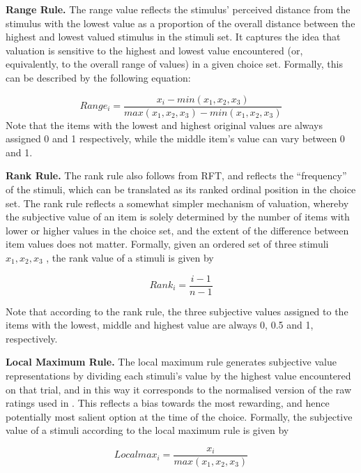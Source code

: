 \documentclass[11pt,a4paper]{article}
\begin{document}
 \textbf{Range Rule.} The range value reflects the stimulus' perceived distance from the stimulus with the lowest value as a proportion of the overall distance between the highest and lowest valued stimulus in the stimuli set. It captures the idea that valuation is sensitive to the highest and lowest value encountered (or, equivalently, to the overall range of values) in a given choice set. Formally, this can be described by the following equation:
 
\begin{equation}
Range_{i}=\frac{x_i - min(x_1,x_2,x_3)}{max(x_1,x_2,x_3)-min(x_1,x_2,x_3)}
\label{eq:range}
\end{equation}
 Note that the items with the lowest and highest original values are always assigned 0 and 1 respectively, while the middle item's value can vary between 0 and 1.
 
 
 \textbf{Rank Rule.} The rank rule also follows from RFT, and reflects the “frequency” of the stimuli, which can be translated as its ranked ordinal position in the choice set. The rank rule reflects a somewhat simpler mechanism of valuation, whereby the subjective value of an item is solely determined by the number of items with lower or higher values in the choice set, and the extent of the difference between item values does not matter. Formally, given an ordered set of three stimuli $x_1, x_2, x_3$ , the rank value of a stimuli is given by
 
\begin{equation}
Rank_{i}=\frac{i-1}{n-1}
\label{eq:rank}
\end{equation}

Note that according to the rank rule, the three subjective values assigned to the items with the lowest, middle and highest value are always 0, 0.5 and 1, respectively.

\textbf{Local Maximum Rule.} The local maximum rule generates subjective value representations by dividing each stimuli's value by the highest value encountered on that trial, and in this way it corresponds to the normalised version of the raw ratings used in . This reflects a bias towards the most rewarding, and hence potentially most salient option at the time of the choice. Formally, the subjective value of a stimuli according to the local maximum rule is given by

\begin{equation}
Local max_{i}=\frac{x_i}{max(x_1,x_2,x_3)}
\label{eq:locmax}
\end{equation}
\end{document}
